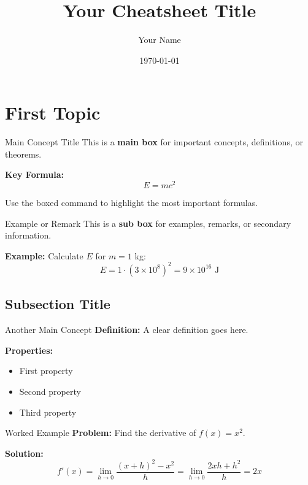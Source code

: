 \documentclass[a4paper, fontsize=7pt]{scrartcl}
\title{Your Cheatsheet Title}
\author{Your Name}
\date{\today}
\begin{document}
\maketitle

\section{First Topic}

\begin{mainbox}{Main Concept Title}
This is a \textbf{main box} for important concepts, definitions, or theorems.

\textbf{Key Formula:}
$$\boxed{E = mc^2}$$

Use the boxed command to highlight the most important formulas.
\end{mainbox}

\begin{subbox}{Example or Remark}
This is a \textbf{sub box} for examples, remarks, or secondary information.

\textbf{Example:} Calculate $E$ for $m = 1$ kg:
$$E = 1 \cdot (3 \times 10^8)^2 = 9 \times 10^{16} \text{ J}$$
\end{subbox}

\subsection{Subsection Title}

\begin{mainbox}{Another Main Concept}
\textbf{Definition:} A clear definition goes here.

\textbf{Properties:}
\begin{itemize}
    \item First property
    \item Second property
    \item Third property
\end{itemize}
\end{mainbox}

\begin{subbox}{Worked Example}
\textbf{Problem:} Find the derivative of $f(x) = x^2$.

\textbf{Solution:}
$$f'(x) = \lim_{h \to 0} \frac{(x+h)^2 - x^2}{h} = \lim_{h \to 0} \frac{2xh + h^2}{h} = 2x$$
\end{subbox}
\end{document}
